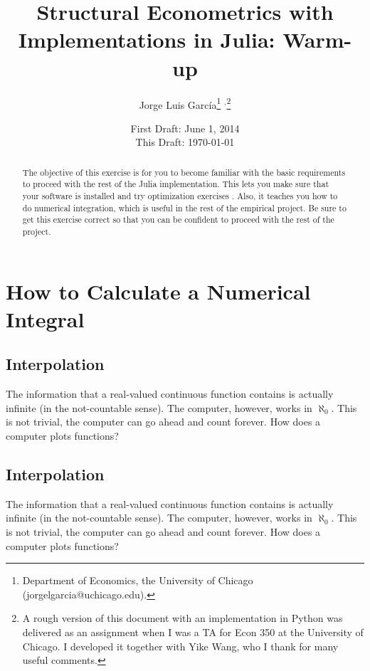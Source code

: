 



\title{\textbf{Structural Econometrics with Implementations in Julia: Warm-up}}
\author{Jorge Luis Garc\'{i}a\thanks{Department of Economics, the University of Chicago (jorgelgarcia@uchicago.edu).} $^{,}$\thanks{A rough version of this document with an implementation in Python was delivered as an assignment when I was a TA for Econ 350 at the University of Chicago. I developed it together with Yike Wang, who I thank for many useful comments.}}
\date{First Draft: June 1, 2014 \\ This Draft: \today}
\maketitle

\begin{abstract}
\noindent The objective of this exercise is for you to become familiar with the basic requirements to proceed with the rest of the Julia implementation. This lets you make sure that your software is installed and try optimization exercises . Also, it teaches you how to do numerical integration, which is useful in the rest of the empirical project. Be sure to get this exercise correct so that you can be confident to proceed with the rest of the project. 
\end{abstract}

\section{How to Calculate a Numerical Integral}

\subsection{Interpolation}
The information that a real-valued continuous function contains is actually infinite (in the not-countable sense). The computer, however, works in $\aleph_{0}$. This is not trivial, the computer can go ahead and count forever. How does a computer plots functions?
\subsection{Interpolation}
The information that a real-valued continuous function contains is actually infinite (in the not-countable sense). The computer, however, works in $\aleph_{0}$. This is not trivial, the computer can go ahead and count forever. How does a computer plots functions?

